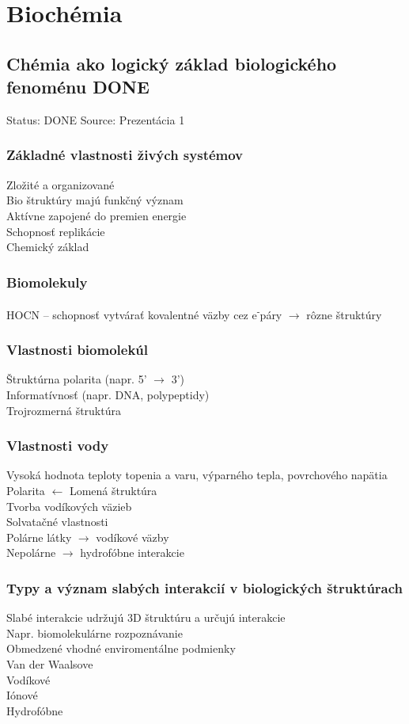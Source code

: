 \newcommand\tab[1][1cm]{\hspace*{#1}}
\newcommand{\el}{e\textsuperscript{-}}
\chapter[Biochémia]{Biochémia}
\label{biochemia} %

\section{Chémia ako logický základ biologického fenoménu DONE}
Status: DONE
Source: Prezentácia 1
\\
\subsection{Základné vlastnosti živých systémov}
Zložité a organizované\\
Bio štruktúry majú funkčný význam\\
Aktívne zapojené do premien energie\\
Schopnosť replikácie\\
Chemický základ
\subsection{Biomolekuly}
HOCN -- schopnosť vytvárať kovalentné väzby cez \el páry $\rightarrow$ rôzne štruktúry
\subsection{Vlastnosti biomolekúl}
Štruktúrna polarita (napr. 5' $\rightarrow$ 3')\\
Informatívnosť (napr. DNA, polypeptidy)\\
Trojrozmerná štruktúra\\
\subsection{Vlastnosti vody}
Vysoká hodnota teploty topenia a varu, výparného tepla, povrchového napätia\\
Polarita $\leftarrow$ Lomená štruktúra\\
Tvorba vodíkových väzieb\\
Solvatačné vlastnosti\\
\tab Polárne látky $\rightarrow$ vodíkové väzby\\
\tab Nepolárne $\rightarrow$ hydrofóbne interakcie
\subsection{Typy a význam slabých interakcií v biologických štruktúrach}
Slabé interakcie udržujú 3D štruktúru a určujú interakcie\\
\tab Napr. biomolekulárne rozpoznávanie\\
\tab Obmedzené vhodné enviromentálne podmienky\\
Van der Waalsove\\
Vodíkové\\
Iónové\\
Hydrofóbne
